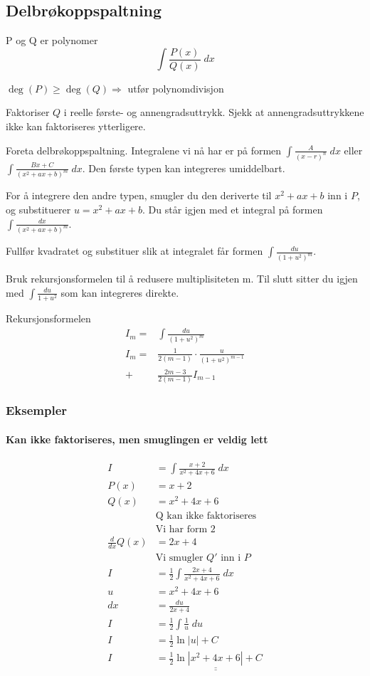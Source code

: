 \documentclass[defaultpackages]{cheatsheet}
\def\doubleunderline#1{\underline{\underline{#1}}}
\begin{document}
	\subsection{Delbrøkoppspaltning}
	P og Q er polynomer
	$$\int \frac{P(x)}{Q(x)}\;dx$$

	\begin{compactenum}
		\item $\deg(P) \ge \deg(Q) \Rightarrow$ utfør polynomdivisjon
		\item Faktoriser $Q$ i reelle første- og annengradsuttrykk. Sjekk at annengradsuttrykkene ikke kan faktoriseres ytterligere.
		\item Foreta delbrøkoppspaltning. Integralene vi nå har er på formen $\int \frac{A}{(x-r)^n}\;dx$ eller $\int \frac{Bx+C}{(x^2+ax+b)^m}\;dx$. Den første typen kan integreres umiddelbart.
		\item For å integrere den andre typen, smugler du den deriverte til $x^2+ax+b$ inn i $P$, og substituerer $u=x^2+ax+b$. Du står igjen med et integral på formen $\int \frac{dx}{(x^2+ax+b)^m}$.
		\item Fullfør kvadratet og substituer slik at integralet får formen $\int \frac{du}{(1+u^2)^m}$.
		\item Bruk rekursjonsformelen til å redusere multiplisiteten m. Til slutt sitter du igjen med $\int \frac{du}{1+u^2}$ som kan integreres direkte.
	\end{compactenum}
	Rekursjonsformelen
	\begin{align*}
	I_m =& \int\frac{du}{(1+u^2)^m}\\
	I_m =& \frac{1}{2(m-1)}\cdot\frac{u}{(1+u^2)^{m-1}}\\
	+& \frac{2m-3}{2(m-1)}I_{m-1}
	\end{align*}
	\subsubsection{Eksempler}
	\paragraph{Kan ikke faktoriseres, men smuglingen er veldig lett}
	\begin{align*}
		I &= \int \frac{x+2}{x^2+4x+6}\;dx\\
		P(x) &= x+2\\
		Q(x) &= x^2+4x+6\\
		&\text{Q kan ikke faktoriseres}\tag{2}\\
		&\text{Vi har form 2}\tag{3}\\
		\frac{d}{dx}Q(x) &= 2x + 4\\
		&\text{Vi smugler $Q'$ inn i $P$}\tag{4}\\
		I &= \frac{1}{2}\int \frac{2x+4}{x^2+4x+6}\; dx\\
		u&=x^2+4x+6\\
		dx &= \frac{du}{2x+4}\\
		I &= \frac{1}{2} \int \frac{1}{u}\;du\\
		I&= \frac{1}{2}\ln|u|+C\\
		I&= \doubleunderline{\frac{1}{2}\ln|x^2+4x+6|+C}
	\end{align*}
\end{document}
